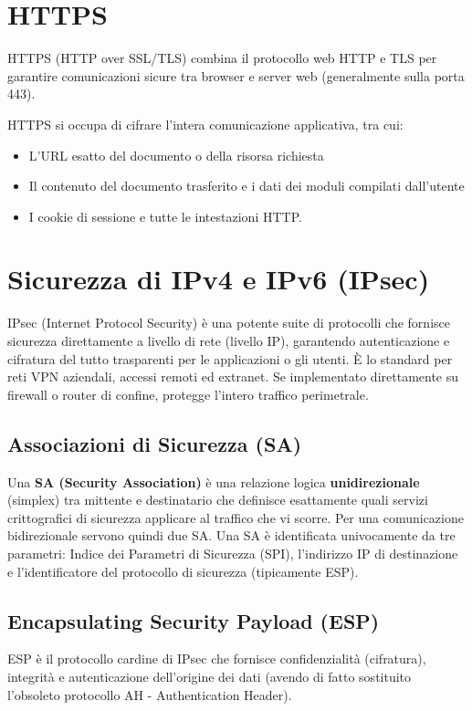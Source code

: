 \section{HTTPS}

HTTPS (HTTP over SSL/TLS) combina il protocollo web HTTP e TLS per garantire comunicazioni sicure tra browser e server web (generalmente sulla porta 443). 

HTTPS si occupa di cifrare l'intera comunicazione applicativa, tra cui:
\begin{itemize}
    \item L'URL esatto del documento o della risorsa richiesta
    \item Il contenuto del documento trasferito e i dati dei moduli compilati dall'utente
    \item I cookie di sessione e tutte le intestazioni HTTP.
\end{itemize}

\section{Sicurezza di IPv4 e IPv6 (IPsec)}

IPsec (Internet Protocol Security) è una potente suite di protocolli che fornisce sicurezza direttamente a livello di rete (livello IP), garantendo autenticazione e cifratura del tutto trasparenti per le applicazioni o gli utenti. È lo standard per reti VPN aziendali, accessi remoti ed extranet. Se implementato direttamente su firewall o router di confine, protegge l'intero traffico perimetrale.

\subsection{Associazioni di Sicurezza (SA)}
Una \textbf{SA (Security Association)} è una relazione logica \textbf{unidirezionale} (simplex) tra mittente e destinatario che definisce esattamente quali servizi crittografici di sicurezza applicare al traffico che vi scorre. Per una comunicazione bidirezionale servono quindi due SA. Una SA è identificata univocamente da tre parametri: Indice dei Parametri di Sicurezza (SPI), l'indirizzo IP di destinazione e l'identificatore del protocollo di sicurezza (tipicamente ESP).

\subsection{Encapsulating Security Payload (ESP)}
ESP è il protocollo cardine di IPsec che fornisce confidenzialità (cifratura), integrità e autenticazione dell'origine dei dati (avendo di fatto sostituito l'obsoleto protocollo AH - Authentication Header). 

